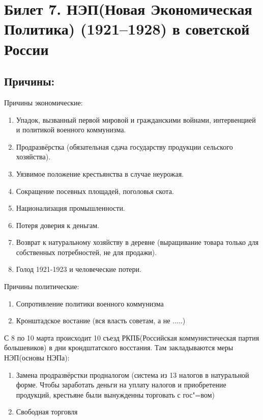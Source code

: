 \section{Билет 7. НЭП(Новая Экономическая Политика) (1921--1928) в советской России}

\subsection{Причины:}

Причины экономические:

\begin{enumerate}
    \item Упадок, вызванный первой мировой и гражданскими войнами, интервенцией и политикой военного коммунизма.
    \item Продразвёрстка (обязательная сдача государству продукции сельского хозяйства).
    \item Уязвимое положение крестьянства в случае неурожая.
    \item Сокращение посевных площадей, поголовья скота.
    \item Национализация промышленности.
    \item Потеря доверия к деньгам.
    \item Возврат к натуральному хозяйству в деревне (выращивание товара только для собственных потребностей, не для продажи).
    \item Голод 1921-1923 и человеческие потери.
\end{enumerate}

\vspace{0.5cm}

Причины политические:

\begin{enumerate}
    \item Сопротивление политики военного коммунизма 
    \item Кронштадское востание (вся власть советам, а не .....)
\end{enumerate}

\vspace{0.5cm}

С 8 по 10 марта происходит 10 съезд РКПБ(Российская коммунистическая партия большевиков) в дни крондштатского восстания. Там закладываются меры НЭП(основы НЭПа):

\begin{enumerate}
    \item Замена продразвёрстки продналогом (система из 13 налогов в натуральной форме. Чтобы заработать деньги на уплату налогов и приобретение продукций, крестьяне были вынужденны торговать с гос"=вом)
    \item Свободная торговля
\end{enumerate}

